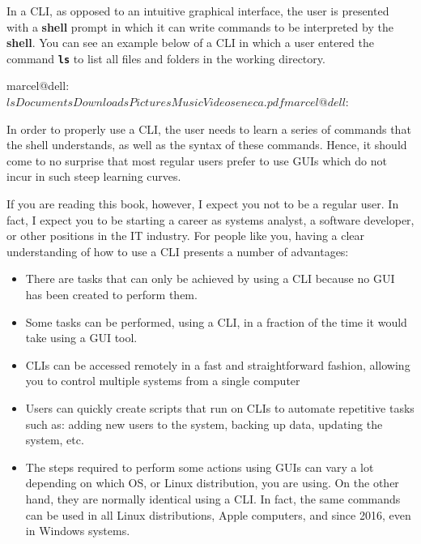 In a \acs{CLI}, as opposed to an intuitive graphical interface, the user is presented with a \textbf{shell} prompt in which it can write commands to be interpreted by the \textbf{shell}. You can see an example below of a \acs{CLI} in which a user entered the command \textbf{\texttt{ls}} to list all files and folders in the working directory.

\begin{command_line}[Bash]
marcel@dell:~$ ls
Documents      Downloads      Pictures
Music          Video          seneca.pdf
marcel@dell:~$
\end{command_line}

In order to properly use a \acs{CLI}, the user needs to learn a series of commands that the shell understands, as well as the syntax of these commands. Hence, it should come to no surprise that most regular users prefer to use \acs{GUI}s which do not incur in such steep learning curves.

If you are reading this book, however, I expect you not to be a regular user. In fact, I expect you to be starting a career as systems analyst, a software developer, or other positions in the IT industry. For people like you, having a clear understanding of how to use a \acs{CLI} presents a number of advantages:
\begin{itemize}
    \item There are tasks that can only be achieved by using a \acs{CLI} because no \acs{GUI} has been created to perform them.
    \item Some tasks can be performed, using a \acs{CLI}, in a fraction of the time it would take using a \acs{GUI} tool.
    \item \acs{CLI}s can be accessed remotely in a fast and straightforward fashion, allowing you to control multiple systems from a single computer
    \item Users can quickly create scripts that run on \acs{CLI}s to automate repetitive tasks such as: adding new users to the system, backing up data, updating the system, etc.
    \item The steps required to perform some actions using \acs{GUI}s can vary a lot depending on which \acs{OS}, or Linux distribution, you are using. On the other hand, they are normally identical using a CLI. In fact, the same commands can be used in all Linux distributions, Apple computers, and since 2016, even in Windows systems.
\end{itemize}

